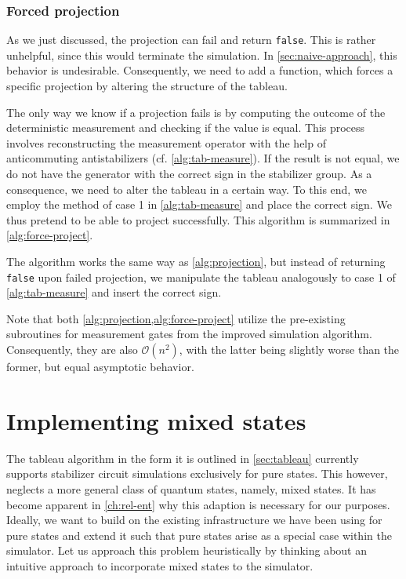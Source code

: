 \subsubsection{Forced projection}
As we just discussed, the projection can fail and return \verb|false|. This is rather
unhelpful, since this would terminate the simulation. In
\cref{sec:naive-approach}, this behavior is undesirable. Consequently, we need
to add a function, which forces a specific projection by altering the structure
of the tableau.

The only way we know if a projection fails is by computing the outcome of the
deterministic measurement and checking if the value is equal. This process
involves reconstructing the measurement operator with the help of anticommuting
antistabilizers (cf. \cref{alg:tab-measure}). If the result is not equal, we do
not have the generator with the correct sign in the stabilizer group. As a
consequence, we need to alter the tableau in a certain way. To this end, we
employ the method of case 1 in \cref{alg:tab-measure} and place the correct
sign. We thus pretend to be able to project successfully. This algorithm is
summarized in \cref{alg:force-project}.
\begin{alg}\label{alg:force-project}
  The algorithm works the same way as \cref{alg:projection}, but instead of
  returning \verb|false| upon failed projection, we manipulate the tableau
  analogously to case 1 of \cref{alg:tab-measure} and insert the correct sign.  
\end{alg}
Note that both \cref{alg:projection,alg:force-project} utilize the pre-existing
subroutines for measurement gates from the improved simulation algorithm.
Consequently, they are also $\mathcal{O}\left( n^2 \right)$, with the latter
being slightly worse than the former, but equal asymptotic behavior.
\clearpage
\section{Implementing mixed states}\label{sec:mixed-states}
The tableau algorithm in the form it is outlined in \cref{sec:tableau}
currently supports stabilizer circuit simulations exclusively for pure states.
This however,
neglects a more general class of quantum states, namely, mixed states. It has
become apparent in \cref{ch:rel-ent} why this adaption is necessary for our
purposes. Ideally, we want to build on the existing infrastructure we have been
using for pure states and extend it such that pure states arise as a special
case within the simulator. 
Let us approach this problem
heuristically by thinking about an intuitive approach to incorporate mixed
states to the simulator.

